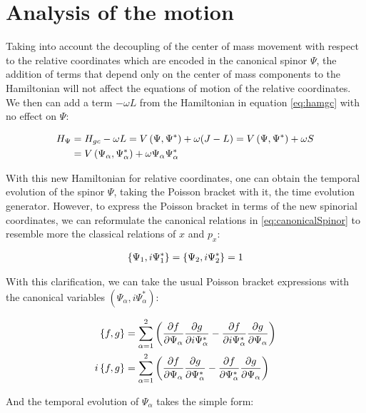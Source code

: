 \section{Analysis of the motion}
Taking into account the decoupling of the center of mass movement with respect to the relative coordinates which are encoded in the canonical spinor $\Psi$, the addition of terms that depend only on the center of mass components to the Hamiltonian will not affect the equations of motion of the relative coordinates. We then can add a term $-\omega L$ from the Hamiltonian in equation \eqref{eq:hamgc} with no effect on $\Psi$:

\begin{align*}
H_{\Psi} &= H_{gc} - \omega L =  V\left( \Psi,\Psi^* \right)+ \omega (J-L) = V\left( \Psi,\Psi^* \right)+ \omega S\\
&= V\left( \Psi_\alpha,\Psi_\alpha^* \right)+ \omega\Psi_\alpha\Psi^*_\alpha
\end{align*}

With this new Hamiltonian for relative coordinates, one can obtain the temporal evolution of the spinor $\Psi$, taking the Poisson bracket with it, the time evolution generator. However, to express the Poisson bracket in terms of the new spinorial coordinates, we can reformulate the canonical relations in \eqref{eq:canonicalSpinor} to resemble more the classical relations of $x$ and $p_x$:

\begin{align*}
\left\lbrace \Psi_1, i\Psi^*_1 \right\rbrace = \left\lbrace \Psi_2, i\Psi^*_2 \right\rbrace = 1
\end{align*}

With this clarification, we can take the usual Poisson bracket expressions with the canonical variables $(\Psi_\alpha,i\Psi^*_\alpha)$:

\begin{align*}
\left\lbrace f, g \right\rbrace &= \sum_{\alpha = 1}^2 \left( \frac{\partial f}{\partial \Psi_\alpha }\frac{\partial g}{\partial i\Psi_\alpha^*}-\frac{\partial f}{\partial i\Psi_\alpha^* }\frac{\partial g}{\partial \Psi_\alpha} \right) \\
i\left\lbrace f, g \right\rbrace &= \sum_{\alpha = 1}^2 \left( \frac{\partial f}{\partial \Psi_\alpha }\frac{\partial g}{\partial \Psi_\alpha^*}-\frac{\partial f}{\partial \Psi_\alpha^* }\frac{\partial g}{\partial \Psi_\alpha} \right) \\
\end{align*}

And the temporal evolution of $\Psi_\alpha$ takes the simple form:

